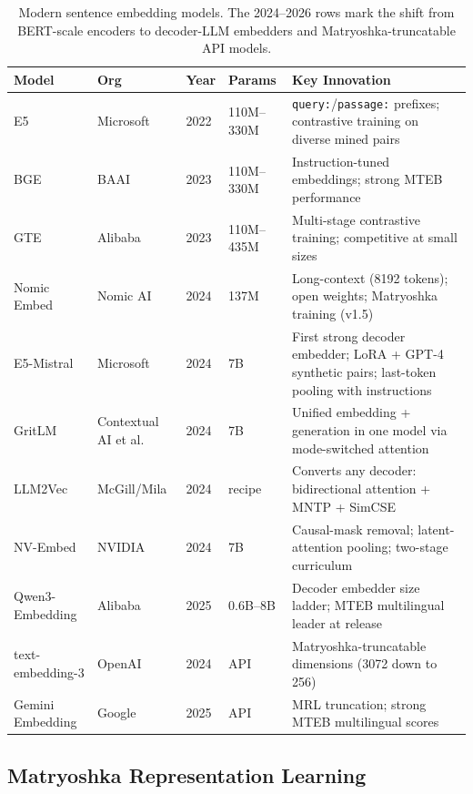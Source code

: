 \begin{table}[H]
\centering
\caption{Modern sentence embedding models.  The 2024--2026 rows mark the
shift from BERT-scale encoders to decoder-LLM embedders and
Matryoshka-truncatable API models.}
\label{tab:modern_embeddings}
\small
\begin{tabularx}{\textwidth}{l l l l >{\raggedright\arraybackslash}X}
\toprule
\textbf{Model} & \textbf{Org} & \textbf{Year} & \textbf{Params}
& \textbf{Key Innovation} \\
\midrule
E5 & Microsoft & 2022 & 110M--330M & \texttt{query:}/\texttt{passage:}
    prefixes; contrastive training on diverse mined pairs \\
BGE & BAAI & 2023 & 110M--330M & Instruction-tuned embeddings; strong
    MTEB performance \\
GTE & Alibaba & 2023 & 110M--435M & Multi-stage contrastive training;
    competitive at small sizes \\
Nomic Embed & Nomic AI & 2024 & 137M & Long-context (8192 tokens); open
    weights; Matryoshka training (v1.5) \\
E5-Mistral & Microsoft & 2024 & 7B & First strong decoder embedder; LoRA +
    GPT-4 synthetic pairs; last-token pooling with instructions \\
GritLM & Contextual AI et al. & 2024 & 7B & Unified embedding + generation
    in one model via mode-switched attention \\
LLM2Vec & McGill/Mila & 2024 & recipe & Converts any decoder: bidirectional
    attention + MNTP + SimCSE \\
NV-Embed & NVIDIA & 2024 & 7B & Causal-mask removal; latent-attention
    pooling; two-stage curriculum \\
Qwen3-Embedding & Alibaba & 2025 & 0.6B--8B & Decoder embedder size ladder;
    MTEB multilingual leader at release \\
text-embedding-3 & OpenAI & 2024 & API & Matryoshka-truncatable dimensions
    (3072 down to 256) \\
Gemini Embedding & Google & 2025 & API & MRL truncation; strong MTEB
    multilingual scores \\
\bottomrule
\end{tabularx}
\end{table}

\subsection{Matryoshka Representation Learning}
\label{subsec:mrl}

